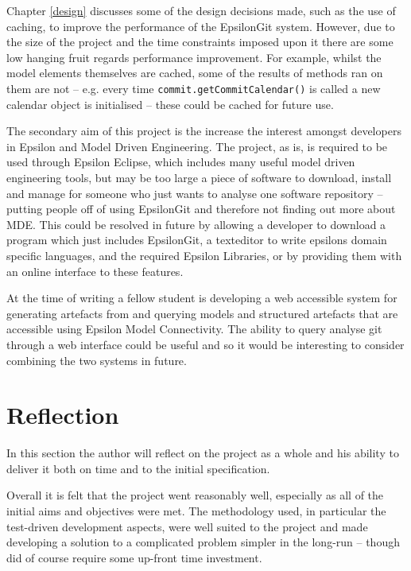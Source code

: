 \documentclass[11pt]{book}
\newcommand{\code}[1]{\texttt{#1}}
\begin{document}
Chapter \ref{design} discusses some of the design decisions made, such as the use of caching, to improve the performance of the EpsilonGit system. However, due to the size of the project and the time constraints imposed upon it there are some low hanging fruit regards performance improvement. For example, whilst the model elements themselves are cached, some of the results of methods ran on them are not -- e.g. every time \code{commit.getCommitCalendar()} is called a new calendar object is initialised -- these could be cached for future use.

The secondary aim of this project is the increase the interest amongst developers in Epsilon and Model Driven Engineering. The project, as is, is required to be used through Epsilon Eclipse, which includes many useful model driven engineering tools, but may be too large a piece of software to download, install and manage for someone who just wants to analyse one software repository -- putting people off of using EpsilonGit and therefore not finding out more about MDE. This could be resolved in future by allowing a developer to download a program which just includes EpsilonGit, a texteditor to write epsilons domain specific languages, and the required Epsilon Libraries, or by providing them with an online interface to these features.

At the time of writing a fellow student is developing a web accessible system for generating artefacts from and querying models and structured artefacts that are accessible using Epsilon Model Connectivity. The ability to query analyse git through a web interface could be useful and so it would be interesting to consider combining the two systems in future.

\section{Reflection}
In this section the author will reflect on the project as a whole and his ability to deliver it both on time and to the initial specification.

Overall it is felt that the project went reasonably well, especially as all of the initial aims and objectives were met. The methodology used, in particular the test-driven development aspects, were well suited to the project and made developing a solution to a complicated problem simpler in the long-run -- though did of course require some up-front time investment.
\end{document}
